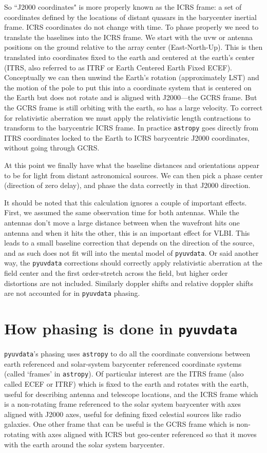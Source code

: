 \documentclass[11pt, oneside]{article}   	%
\begin{document}
So ``J2000 coordinates" is more properly known as the ICRS frame:  a set of coordinates defined by the locations of distant quasars in the barycenter inertial frame. ICRS coordinates do not change with time. To phase properly we need to translate the baselines into the ICRS frame. We start with the uvw or antenna positions on the ground relative to the array center (East-North-Up). This is then translated into coordinates fixed to the earth and centered at the earth's center (ITRS, also referred to as ITRF or Earth Centered Earth Fixed ECEF). Conceptually we can then unwind the Earth's rotation (approximately LST) and the motion of the pole to put this into a coordinate system that is centered on the Earth but does not rotate and is aligned with J2000---the GCRS frame. But the GCRS frame is still orbiting with the earth, so has a large velocity. To correct for relativistic aberration we must apply the relativistic length contractions to transform to the barycentric ICRS frame. In practice \texttt{astropy} goes directly from ITRS coordinates locked to the Earth to ICRS barycentric J2000 coordinates, without going through GCRS.

At this point we finally have what the baseline distances and orientations appear to be for light from distant astronomical sources. We can then pick a phase center (direction of zero delay), and phase the data correctly in that J2000 direction.

It should be noted that this calculation ignores a couple of important effects. First, we assumed the same observation time for both antennas. While the antennas don't move a large distance between when the wavefront hits one antenna and when it hits the other, this is an important effect for VLBI. This leads to a small baseline correction that depends on the direction of the source, and as such does not fit will into the mental model of \texttt{pyuvdata}. Or said another way, the \texttt{pyuvdata} corrections should correctly apply relativistic aberration at the field center and the first order-stretch across the field, but higher order distortions are not included. Similarly doppler shifts and relative doppler shifts are not accounted for in \texttt{pyuvdata} phasing.



\section{How phasing is done in \texttt{pyuvdata}}
\texttt{pyuvdata}'s phasing uses \texttt{astropy} to do all the coordinate conversions between earth referenced and solar-system barycenter referenced coordinate systems (called `frames' in \texttt{astropy}). Of particular interest are the ITRS frame (also called ECEF or ITRF) which is fixed to the earth and rotates with the earth, useful for describing antenna and telescope locations, and the ICRS frame which is a non-rotating frame referenced to the solar system barycenter with axes aligned with J2000 axes, useful for defining fixed celestial sources like radio galaxies. One other frame that can be useful is the GCRS frame which is non-rotating with axes aligned with ICRS but geo-center referenced so that it moves with the earth around the solar system barycenter.
\end{document}
